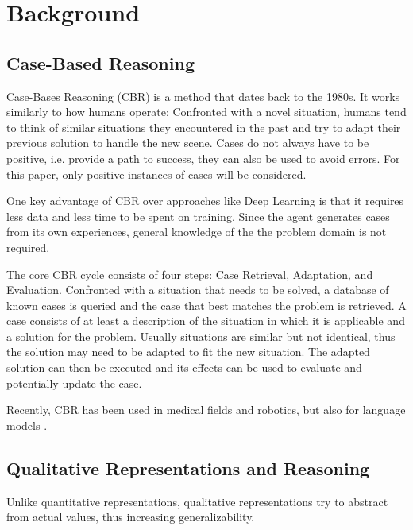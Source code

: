 \section{Background}\label{sec:background}

\subsection{Case-Based Reasoning}
Case-Bases Reasoning (CBR) is a method that dates back to the 1980s. It works similarly to how humans operate: Confronted with a novel situation, humans tend to think of similar situations they encountered in the past and try to adapt their previous solution to handle the new scene. Cases do not always have to be positive, i.e. provide a path to success, they can also be used to avoid errors.\cite{Kolodner1992} For this paper, only positive instances of cases will be considered.

One key advantage of CBR over approaches like Deep Learning is that it requires less data and less time to be spent on training. Since the agent generates cases from its own experiences, general knowledge of the the problem domain is not required.\cite{CBR-issues-variations-approaches}

The core \ac{CBR} cycle consists of four steps: Case Retrieval, Adaptation, and Evaluation.\cite{Kolodner1992}
Confronted with a situation that needs to be solved, a database of known cases is queried and the case that best matches the problem is retrieved. A case consists of at least a description of the situation in which it is applicable and a solution for the problem. Usually situations are similar but not identical, thus the solution may need to be adapted to fit the new situation. The adapted solution can then be executed and its effects can be used to evaluate and potentially update the case.


Recently, CBR has been used in medical fields\cite{medical1, medical2} and robotics\cite{QCBR}, but also for language models \cite{text, text2}. %

\subsection{Qualitative Representations and Reasoning}
Unlike quantitative representations, qualitative representations try to abstract from actual values, thus increasing generalizability.


